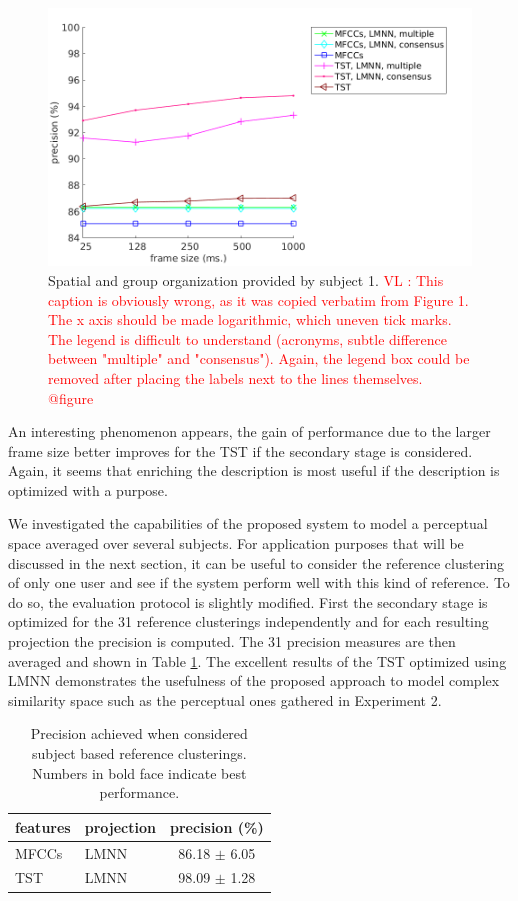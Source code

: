 \documentclass{article}
\newcommand{\vl}[1]{\textcolor{red}{VL : #1}}
\begin{document}
\begin{figure}
\center
\includegraphics[width = \textwidth]{figures/frame.png}
\caption{Spatial and group organization provided by subject 1.
\vl{This caption is obviously wrong, as it was copied verbatim from Figure 1. The x axis should be made logarithmic, which uneven tick marks.
The legend is difficult to understand (acronyms, subtle difference between "multiple" and "consensus").
Again, the legend box could be removed after placing the labels next to the lines themselves. @figure}}
\label{fig:frame}
\end{figure}

An interesting phenomenon appears, the gain of performance due to the larger frame size better improves for the TST if the secondary stage is considered. Again, it seems that enriching the description is most useful if the description is optimized with a purpose.

We investigated the capabilities of the proposed system to model a perceptual space averaged over several subjects. For application purposes that will be discussed in the next section, it can be useful to consider the reference clustering of only one user and see if the system perform well with this kind of reference. To do so, the evaluation protocol is slightly modified. First the secondary stage is optimized for the 31 reference clusterings independently and for each resulting projection the precision is computed. The 31 precision measures are then averaged and shown in Table \ref{tab:res2}. The excellent results of the TST optimized using LMNN demonstrates the usefulness of the proposed approach to model complex similarity space such as the perceptual ones gathered in Experiment 2.


\begin{table}
  \caption{Precision achieved when considered subject based reference clusterings. Numbers in bold face indicate best performance.}
  \label{tab:res2}
  \begin{center}
\begin{tabular}{llc}
features & projection & precision (\%) \\
  \hline
MFCCs & LMNN & 86.18 $\pm$ 6.05 \\
TST & LMNN & 98.09 $\pm$ 1.28 \\
\end{tabular}
\end{center}
\end{table}
\end{document}
